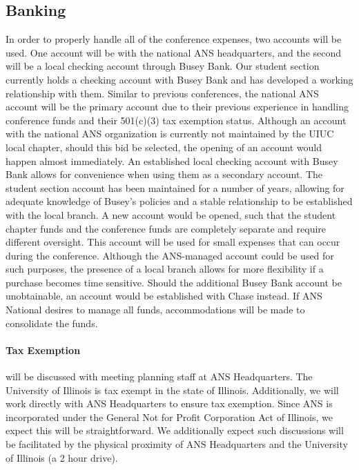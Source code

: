 \subsection{Banking}

In order to properly handle all of the conference expenses, two accounts will be used. One account will be with the national ANS headquarters, and the second will be a local checking account through Busey Bank. Our student section currently holds a checking account with Busey Bank and has developed a working relationship with them. Similar to previous conferences, the national ANS account will be the primary account due to their previous experience in handling conference funds and their 501(c)(3) tax exemption status. Although an account with the national ANS organization is currently not maintained by the UIUC local chapter, should this bid be selected, the opening of an account would happen almost immediately. An established local checking account with Busey Bank allows for convenience when using them as a secondary account. The student section account has been maintained for a number of years, allowing for adequate knowledge of Busey’s policies and a stable relationship to be established with the local branch. A new account would be opened, such that the student chapter funds and the conference funds are completely separate and require different oversight. This account will be used for small expenses that can occur during the conference. Although the ANS-managed account could be used for such purposes, the presence of a local branch allows for more flexibility if a purchase becomes time sensitive. Should the additional Busey Bank account be unobtainable, an account would be established with Chase instead. If ANS National desires to manage all funds, accommodations will be made to consolidate the funds.

\paragraph{Tax Exemption} will be discussed with meeting planning staff at
ANS Headquarters. The University of Illinois is tax exempt in the state of Illinois. 
Additionally, we will work directly with ANS Headquarters to ensure tax 
exemption. Since ANS is incorporated under the General Not for Profit 
Corporation Act of Illinois, we expect this will be straightforward. We 
additionally expect such discussions will be facilitated by the physical 
proximity of ANS Headquarters and the University of Illinois (a 2 hour drive).

